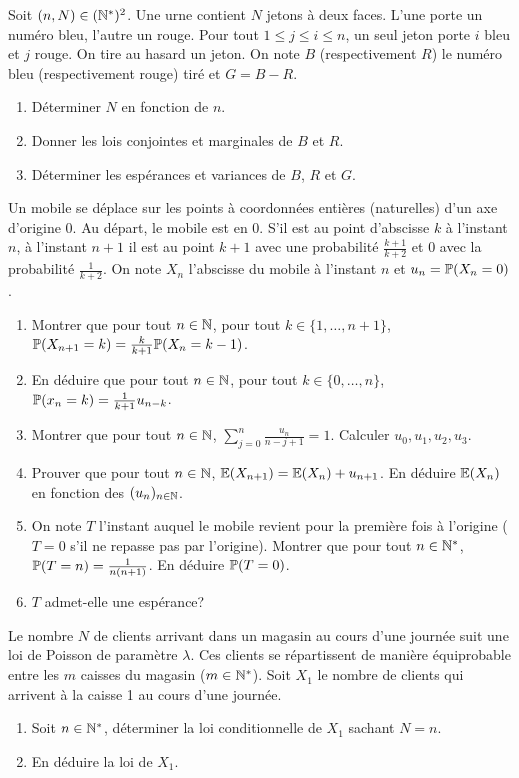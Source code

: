 \documentclass[12pt]{article}
\begin{document}
\begin{exercise}
	Soit $(n,N)\in(\N^{*})^{2}$. Une urne contient $N$ jetons à deux faces. L'une
	porte un numéro bleu, l'autre un rouge. Pour tout $1\leqslant j\leqslant
	i\leqslant n$, un seul jeton porte $i$ bleu et $j$ rouge. On tire au hasard un
	jeton. On note $B$ (respectivement $R$) le numéro bleu (respectivement rouge)
	tiré et $G=B-R$.
	\begin{enumerate}
		\item
		Déterminer $N$ en fonction de $n$.
		\item
		Donner les lois conjointes et marginales de $B$ et $R$.
		\item
		Déterminer les espérances et variances de $B$, $R$ et $G$.
	\end{enumerate}
\end{exercise}

\begin{exercise}
	Un mobile se déplace sur les points à coordonnées entières (naturelles) d'un
	axe d'origine 0. Au départ, le mobile est en 0. S'il est au point d'abscisse
	$k$ à l'instant $n$, à l'instant $n+1$ il est au point $k+1$ avec une
	probabilité $\frac{k+1}{k+2}$ et 0 avec la probabilité $\frac{1}{k+2}$. On
	note $X_{n}$ l'abscisse du mobile à l'instant $n$ et $u_{n}=\P(X_{n}=0)$.
	\begin{enumerate}
		\item
		Montrer que pour tout $n\in\N$, pour tout $k\in\{1,\dots,n+1\}$,
		$\P(X_{n+1}=k)=\frac{k}{k+1}\P(X_{n}=k-1)$.
		\item
		En déduire que pour tout $n\in\N$, pour tout $k\in\{0,\dots,n\}$,
		$\P(x_{n}=k)=\frac{1}{k+1}u_{n-k}$.
		\item
		Montrer que pour tout $n\in\N$, $\sum_{j=0}^{n}\frac{u_{n}}{n-j+1}=1$.
		Calculer $u_{0},u_{1},u_{2},u_{3}$.
		\item
		Prouver que pour tout $n\in\N$, $\E(X_{n+1})=\E(X_{n})+u_{n+1}$. En
		déduire $\E(X_{n})$ en fonction des $(u_{n})_{n\in\N}$.
		\item
		On note $T$ l'instant auquel le mobile revient pour la première fois à
		l'origine ($T=0$ s'il ne repasse pas par l'origine). Montrer que pour tout
		$n\in\N^{*}$, $\P(T=n)=\frac{1}{n(n+1)}$. En déduire $\P(T=0)$.
		\item
		$T$ admet-elle une espérance?
	\end{enumerate}
\end{exercise}

\begin{exercise}
	Le nombre $N$ de clients arrivant dans un magasin au cours d'une journée suit
	une loi de Poisson de paramètre $\lambda$. Ces clients se répartissent de
	manière équiprobable entre les $m$ caisses du magasin ($m\in\N^{*}$). Soit
	$X_{1}$ le nombre de clients qui arrivent à la caisse 1 au cours d'une
	journée. 
	\begin{enumerate}
		\item
		Soit $n\in\N^{*}$, déterminer la loi conditionnelle de $X_{1}$ sachant
		$N=n$.
		\item
		En déduire la loi de $X_{1}$.
	\end{enumerate}
\end{exercise}
\end{document}

